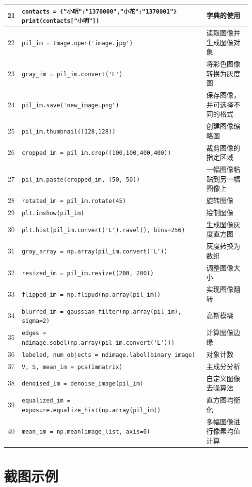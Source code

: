 \documentclass{article}
\begin{document}
\begin{longtable}{|c|p{10cm}|l|}
\hline
21 & \verb|contacts = {"小明":"1370000","小花":"1370001"}| \newline \verb|print(contacts["小明"])| & 字典的使用 \\
\hline
22 & \verb|pil_im = Image.open('image.jpg')| & 读取图像并生成图像对象 \\
\hline
23 & \verb|gray_im = pil_im.convert('L')| & 将彩色图像转换为灰度图 \\
\hline
24 & \verb|pil_im.save('new_image.png')| & 保存图像，并可选择不同的格式 \\
\hline
25 & \verb|pil_im.thumbnail((128,128))| & 创建图像缩略图 \\
\hline
26 & \verb|cropped_im = pil_im.crop((100,100,400,400))| & 裁剪图像的指定区域 \\
\hline
27 & \verb|pil_im.paste(cropped_im, (50, 50))| & 一幅图像粘贴到另一幅图像上 \\
\hline
28 & \verb|rotated_im = pil_im.rotate(45)| & 旋转图像 \\
\hline
29 & \verb|plt.imshow(pil_im)| & 绘制图像 \\
\hline
30 & \verb|plt.hist(pil_im.convert('L').ravel(), bins=256)| & 生成图像灰度直方图 \\
\hline
31 & \verb|gray_array = np.array(pil_im.convert('L'))| & 灰度转换为数组 \\
\hline
32 & \verb|resized_im = pil_im.resize((200, 200))| & 调整图像大小 \\
\hline
33 & \verb|flipped_im = np.flipud(np.array(pil_im))| & 实现图像翻转 \\
\hline
34 & \verb|blurred_im = gaussian_filter(np.array(pil_im), sigma=2)| & 高斯模糊 \\
\hline
35 & \verb|edges = ndimage.sobel(np.array(pil_im.convert('L')))| & 计算图像边缘 \\
\hline
36 & \verb|labeled, num_objects = ndimage.label(binary_image)| & 对象计数 \\
\hline
37 & \verb|V, S, mean_im = pca(immatrix)| & 主成分分析 \\
\hline
38 & \verb|denoised_im = denoise_image(pil_im)| & 自定义图像去噪算法 \\
\hline
39 & \verb|equalized_im = exposure.equalize_hist(np.array(pil_im))| & 直方图均衡化 \\
\hline
40 & \verb|mean_im = np.mean(image_list, axis=0)| & 多幅图像进行像素均值计算 \\
\hline
\end{longtable}
\section{截图示例}
\end{document}
